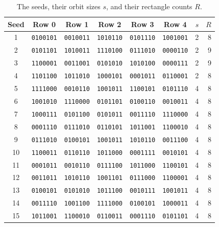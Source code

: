\documentclass[11pt]{article}
\begin{document}
\begin{table}[ht]\centering
\caption{The seeds, their orbit sizes $s$, and their rectangle counts $R$.}\label{t:seeds}
\small\begin{tabular}{c c c c c c r r}\toprule
Seed & Row 0 & Row 1 & Row 2 & Row 3 & Row 4 & $s$ & $R$\\\midrule
1 & \texttt{0100101} & \texttt{0010011} & \texttt{1010110} & \texttt{0101110} & \texttt{1001001} & 2 & 8\\
2 & \texttt{0101101} & \texttt{1010011} & \texttt{1110100} & \texttt{0111010} & \texttt{0000110} & 2 & 9\\
3 & \texttt{1100001} & \texttt{0011001} & \texttt{0101010} & \texttt{1010100} & \texttt{0000111} & 2 & 9\\
4 & \texttt{1101100} & \texttt{1011010} & \texttt{1000101} & \texttt{0001011} & \texttt{0110001} & 2 & 8\\
5 & \texttt{1111000} & \texttt{0010110} & \texttt{1001011} & \texttt{1100101} & \texttt{0101110} & 4 & 8\\
6 & \texttt{1001010} & \texttt{1110000} & \texttt{0101101} & \texttt{0100110} & \texttt{0010011} & 4 & 8\\
7 & \texttt{1000111} & \texttt{0101100} & \texttt{0101011} & \texttt{0011110} & \texttt{1110000} & 4 & 8\\
8 & \texttt{0001110} & \texttt{0111010} & \texttt{0110101} & \texttt{1011001} & \texttt{1100010} & 4 & 8\\
9 & \texttt{0111010} & \texttt{0100101} & \texttt{1001011} & \texttt{1010110} & \texttt{0011100} & 4 & 8\\
10 & \texttt{1100011} & \texttt{0110110} & \texttt{1011000} & \texttt{0001111} & \texttt{0010101} & 4 & 8\\
11 & \texttt{0001011} & \texttt{0010110} & \texttt{0111100} & \texttt{1011000} & \texttt{1100101} & 4 & 8\\
12 & \texttt{0011011} & \texttt{1010110} & \texttt{1001101} & \texttt{0111000} & \texttt{1100001} & 4 & 8\\
13 & \texttt{0100101} & \texttt{0101010} & \texttt{1011100} & \texttt{0010111} & \texttt{1001011} & 4 & 8\\
14 & \texttt{0011110} & \texttt{1001100} & \texttt{1111000} & \texttt{0100101} & \texttt{1000011} & 4 & 8\\
15 & \texttt{1011001} & \texttt{1100010} & \texttt{0110011} & \texttt{0001110} & \texttt{0101101} & 4 & 8\\
\bottomrule\end{tabular}\end{table}
\end{document}
